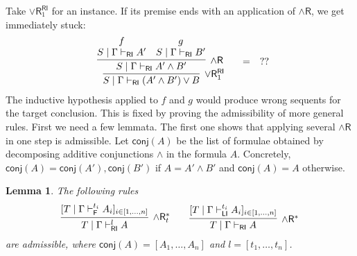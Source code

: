 \documentclass[submission,copyright,creativecommons]{eptcs}
\newtheorem{lemma}[theorem]{Lemma}
\theoremstyle{definition}
\newtheorem{defn}{Definition}[section]
\newcommand{\andr}{\land \mathsf{R}}
\newcommand{\orrone}{\lor \mathsf{R}_{1}}
\newcommand{\RI}{\mathsf{RI}}
\newcommand{\LI}{\mathsf{LI}}
\newcommand{\F}{\mathsf{F}}
\newcommand{\conj}[1]{\mathsf{conj} (#1)}
\newcommand{\proofbox}[1]{\begin{tabular}{l} #1 \end{tabular}}
\newcommand\niccolo[1]{\mbox{}
{\marginpar{\color{red}NV}}
{\sf\noindent\color{red}#1}}%
\begin{document}
Take $\orrone^{\RI}$ for an instance. If its premise ends with an application of $\andr$, we get immediately stuck:
\begin{displaymath}
  \begin{array}{c}
    \proofbox{
    \infer[\orrone^{\RI}]{S \mid \Gamma \vdash_{\RI} (A' \land B') \lor B}{
      \infer[\andr]{S \mid \Gamma \vdash_{\RI} A' \land B'}{
        \deduce{S \mid \Gamma \vdash_{\RI} A'}{f}
        &
        \deduce{S \mid \Gamma \vdash_{\RI} B'}{g}
      }
    }
    }
    \quad
    =
    \quad
    ??
  \end{array}
\end{displaymath}
The inductive hypothesis applied to $f$ and $g$ would produce wrong sequents for the target conclusion.
This is fixed by proving the admissibility of more general rules. First we need a few lemmata. 
The first one shows that applying several $\andr$ in one step is admissible.
  Let $\conj{A}$ be the list of formulae obtained by decomposing additive conjunctions $\land$ in the formula $A$. Concretely, $\conj{A} = \conj{A'} , \conj{B'}$ if $A = A' \land B'$ and $\conj{A} = A$ otherwise.
\begin{lemma}\label{lem:BigStep}
  The following rules
  \begin{displaymath}
    \infer[\andr^{*}_t]{T \mid \Gamma \vdash^{l}_{\RI} A}{
      [T \mid \Gamma \vdash^{t_i}_{\F} A_i]_{i \in [1 , \dots , n]}
    }
    \qquad
    \infer[\andr^{*}]{T \mid \Gamma \vdash_{\RI} A}{
      [T \mid \Gamma \vdash^{t_i}_{\LI} A_i]_{i \in [1 , \dots , n]}
    }
  \end{displaymath}
  are admissible, where $\conj{A} = [A_1 , \dots , A_n]$ and $l = [t_1 , \dots , t_n]$.
\end{lemma}
\end{document}
